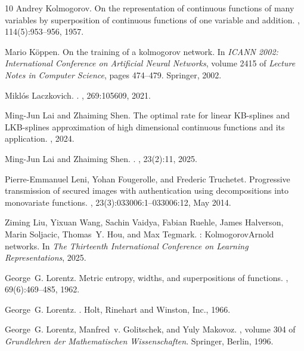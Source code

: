 \documentclass[10pt,reqno,final]{amsart}
\theoremstyle{remark}
\theoremstyle{definition}
\begin{document}
\begin{thebibliography}{10}
Andrey Kolmogorov.
\newblock On the representation of continuous functions of many variables by
  superposition of continuous functions of one variable and addition.
, 114(5):953--956, 1957.

Mario K\"oppen.
\newblock On the training of a kolmogorov network.
\newblock In {\em ICANN 2002: International Conference on Artificial Neural
  Networks}, volume 2415 of {\em Lecture Notes in Computer Science}, pages
  474--479. Springer, 2002.

Mikl{\'o}s Laczkovich.
.
, 269:105609, 2021.

Ming-Jun Lai and Zhaiming Shen.
\newblock The optimal rate for linear {KB}-splines and {LKB}-splines
  approximation of high dimensional continuous functions and its application.
, 2024.

Ming-Jun Lai and Zhaiming Shen.
.
,
  23(2):11, 2025.

Pierre-Emmanuel Leni, Yohan Fougerolle, and Frederic Truchetet.
\newblock Progressive transmission of secured images with authentication using
  decompositions into monovariate functions.
, 23(3):033006:1--033006:12, May
  2014.

Ziming Liu, Yixuan Wang, Sachin Vaidya, Fabian Ruehle, James Halverson, Marin
  Soljacic, Thomas~Y. Hou, and Max Tegmark.
: Kolmogorov{\textendash}{A}rnold networks.
\newblock In {\em The Thirteenth International Conference on Learning
  Representations}, 2025.

George~G. Lorentz.
\newblock Metric entropy, widths, and superpositions of functions.
, 69(6):469--485, 1962.

George~G. Lorentz.
.
\newblock Holt, Rinehart and Winston, Inc., 1966.

George~G. Lorentz, Manfred~v. Golitschek, and Yuly Makovoz.
, volume 304 of {\em Grundlehren der
  Mathematischen Wissenschaften}.
\newblock Springer, Berlin, 1996.


\end{thebibliography}
\end{document}
